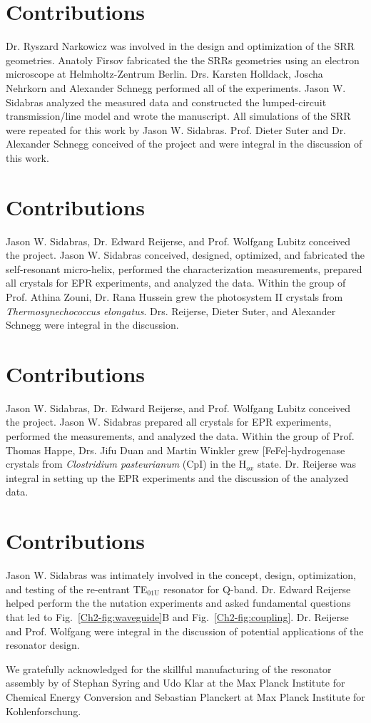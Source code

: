 
\section*{Contributions}
Dr. Ryszard Narkowicz was involved in the design and optimization of the SRR geometries. Anatoly Firsov fabricated the the SRRs geometries using an electron microscope at Helmholtz-Zentrum Berlin. Drs. Karsten Holldack, Joscha Nehrkorn and Alexander Schnegg performed all of the experiments. Jason W. Sidabras analyzed the measured data and constructed the lumped-circuit transmission\-/line model and wrote the manuscript. All simulations of the SRR were repeated for this work by Jason W. Sidabras. Prof. Dieter Suter and Dr. Alexander Schnegg conceived of the project and were integral in the discussion of this work.


\section*{Contributions} Jason W. Sidabras, Dr. Edward Reijerse, and Prof. Wolfgang Lubitz conceived the project. Jason W. Sidabras conceived, designed, optimized, and fabricated the self-resonant micro-helix, performed the characterization measurements, prepared all crystals for EPR experiments, and analyzed the data. Within the group of Prof. Athina Zouni, Dr. Rana Hussein grew the photosystem II crystals from {\em Thermosynechococcus elongatus}. Drs. Reijerse, Dieter Suter, and Alexander Schnegg were integral in the discussion. 


\section*{Contributions} Jason W. Sidabras, Dr. Edward Reijerse, and Prof. Wolfgang Lubitz conceived the project. Jason W. Sidabras prepared all crystals for EPR experiments, performed the measurements, and analyzed the data. Within the group of Prof. Thomas Happe, Drs. Jifu Duan and Martin Winkler grew [FeFe]-hydrogenase crystals from {\em Clostridium pasteurianum} (CpI) in the H$_{ox}$ state. Dr. Reijerse was integral in setting up the EPR experiments and the discussion of the analyzed data. 


\section*{Contributions}
Jason W. Sidabras was intimately involved in the concept, design, optimization, and testing of the re-entrant TE$_{01\text{U}}$ resonator for Q-band. Dr. Edward Reijerse helped perform the the nutation experiments and asked fundamental questions that led to Fig.~\ref{Ch2-fig:waveguide}B and Fig.~\ref{Ch2-fig:coupling}. Dr. Reijerse and Prof. Wolfgang were integral in the discussion of potential applications of the resonator design.

We gratefully acknowledged for the skillful manufacturing of the resonator assembly by of Stephan Syring and Udo Klar at the Max Planck Institute for Chemical Energy Conversion and Sebastian Planckert at Max Planck Institute for Kohlenforschung. 